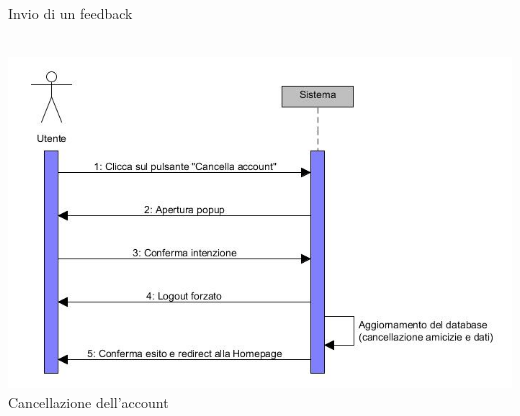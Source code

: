 \documentclass[a4paper,12pt]{article}
\begin{document}
\begin{center}
\caption{Invio di un feedback} \\
\vspace*{\fill}
\includegraphics[scale=0.75]{sDiagrams/cancellazioneAccount.jpg} \\
\caption{Cancellazione dell'account} \\
\end{center}
\clearpage
\end{document}
